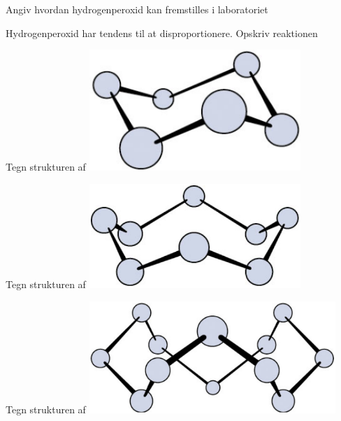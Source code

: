 \begin{flashcard}[Fremstilling]{Angiv hvordan hydrogenperoxid kan fremstilles i laboratoriet}
\end{flashcard}

\begin{flashcard}[Egenskab]{Hydrogenperoxid har tendens til at disproportionere. Opskriv reaktionen}
\end{flashcard}

\begin{flashcard}[Struktur]{Tegn strukturen af }
\includegraphics[width=0.6\textwidth]{figures/k16s428S6.png}
\end{flashcard}

\begin{flashcard}[Struktur]{Tegn strukturen af }
\includegraphics[width=0.6\textwidth]{figures/k16s427S8.png}
\end{flashcard}

\begin{flashcard}[Struktur]{Tegn strukturen af }
\includegraphics[width=0.7\textwidth]{figures/k16s428S12.png}
\end{flashcard}

